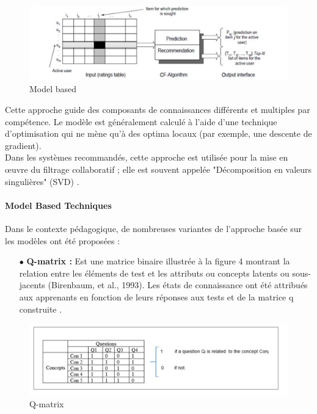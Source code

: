 \begin{figure}[H]
	\begin{center}
		\includegraphics[width=\textwidth]{images/chapitre3/Model_based.png}
	\end{center}
\caption{Model based}
\label{model_based}
\end{figure}

Cette approche guide des composants de connaissances différents et multiples par compétence. Le modèle est généralement calculé à l'aide d'une technique d'optimisation qui ne mène qu'à des optima locaux (par exemple, une descente de gradient). \\
Dans les systèmes recommandés, cette approche est utilisée pour la mise en œuvre du filtrage collaboratif ; elle est souvent appelée "Décomposition en valeurs singulières" (SVD) \cite{koren2011advances}. 

\paragraph{Model Based Techniques}
Dans le contexte pédagogique, de nombreuses variantes de l'approche basée sur les modèles ont été proposées : \\

\begin{itemize}
    \item[$\bullet$] \textbf{Q-matrix :} Est une matrice binaire illustrée à la figure 4 montrant la relation entre les éléments de test et les attributs ou concepts latents ou sous-jacents (Birenbaum, et al., 1993). Les états de connaissance ont été attribués aux apprenants en fonction de leurs réponses aux tests et de la matrice q construite \cite{barnes2005q}.
\end{itemize}

\begin{figure}[H]
	\begin{center}
		\includegraphics[width=\textwidth]{images/chapitre3/q_matrix.png}
	\end{center}
\caption{Q-matrix}
\label{q_matrix}
\end{figure}

